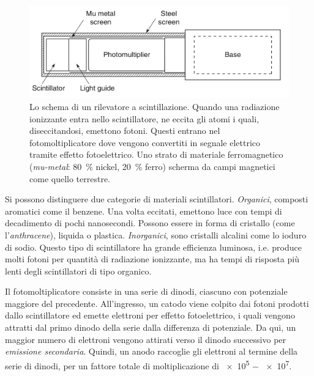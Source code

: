 \documentclass[../main.tex]{subfiles}
\begin{document}
\begin{figure}[b!]
    \centering
    \includegraphics[width=\textwidth]{pmt_trasp.png}
    \caption{Lo schema di un rilevatore a scintillazione. Quando una radiazione ionizzante entra nello scintillatore, ne eccita gli atomi i quali, diseccitandosi, emettono fotoni. Questi entrano nel fotomoltiplicatore dove vengono convertiti in segnale elettrico tramite effetto fotoelettrico. Uno strato di materiale ferromagnetico (\textit{mu-metal}: \SI{80}{\%} nickel, \SI{20}{\%} ferro) scherma da campi magnetici come quello terrestre.}
    \label{fig:pmt}
\end{figure}

Si possono distinguere due categorie di materiali scintillatori.
\textit{Organici}, composti aromatici come il benzene. Una volta eccitati, emettono luce con tempi di decadimento di pochi nanosecondi. Possono essere in forma di cristallo (come l'\textit{anthracene}), liquida o plastica. \textit{Inorganici}, sono cristalli alcalini come lo ioduro di sodio. Questo tipo di scintillatore ha grande efficienza luminosa, i.e. produce molti fotoni per quantità di radiazione ionizzante, ma ha tempi di risposta più lenti degli scintillatori di tipo organico.

Il fotomoltiplicatore consiste in una serie di dinodi, ciascuno con potenziale maggiore del precedente. All'ingresso, un catodo viene colpito dai fotoni prodotti dallo scintillatore ed emette elettroni per effetto fotoelettrico, i quali vengono attratti dal primo dinodo della serie dalla differenza di potenziale. Da qui, un maggior numero di elettroni vengono attirati verso il dinodo successivo per \textit{emissione secondaria}. Quindi, un anodo raccoglie gli elettroni al termine della serie di dinodi, per un fattore totale di moltiplicazione di \SI{e5}{} $-$ \SI{e7}{}.
\end{document}
